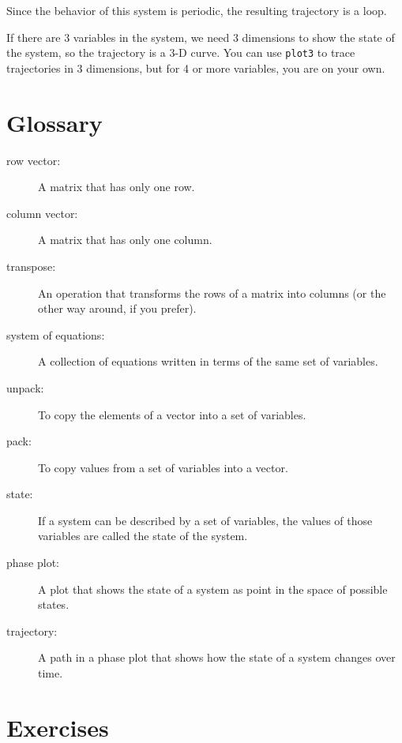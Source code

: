 \documentclass[
]{book}
\begin{document}
Since the behavior of this system is periodic, the resulting
trajectory is a loop.

If there are 3 variables in the system, we need 3 dimensions to show
the state of the system, so the trajectory is a 3-D curve.
You can use {\tt plot3} to trace trajectories in 3 dimensions,
but for 4 or more variables, you are on your own.


\section{Glossary}

\begin{description}

\item[row vector:] A matrix that has only one row.

\item[column vector:] A matrix that has only one column.

\item[transpose:] An operation that transforms the rows of a matrix
into columns (or the other way around, if you prefer).

\item[system of equations:] A collection of equations written in terms of
the same set of variables.

\item[unpack:] To copy the elements of a vector into a set of variables.

\item[pack:] To copy values from a set of variables into a vector.

\item[state:] If a system can be described by a set of variables,
the values of those variables are called the state of the system.

\item[phase plot:] A plot that shows the state of a system as point
in the space of possible states.

\item[trajectory:] A path in a phase plot that shows how the state of
a system changes over time.


\end{description}

\section{Exercises}
\end{document}
